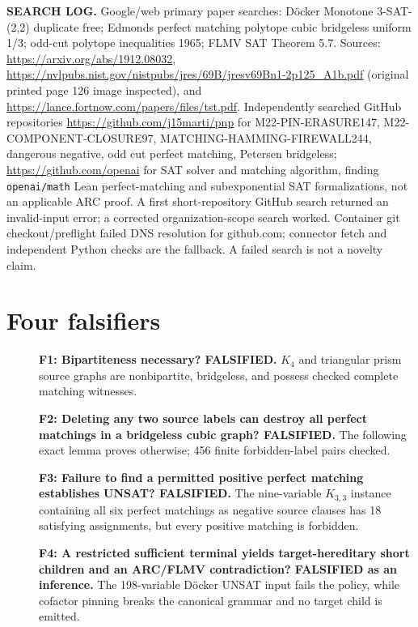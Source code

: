 \documentclass[11pt]{article}
\begin{document}
\noindent\textbf{SEARCH LOG.} Google/web primary paper searches: D\"ocker Monotone 3-SAT-(2,2) duplicate free; Edmonds perfect matching polytope cubic bridgeless uniform 1/3; odd-cut polytope inequalities 1965; FLMV SAT Theorem 5.7. Sources: \url{https://arxiv.org/abs/1912.08032}, \url{https://nvlpubs.nist.gov/nistpubs/jres/69B/jresv69Bn1-2p125_A1b.pdf} (original printed page 126 image inspected), and \url{https://lance.fortnow.com/papers/files/tst.pdf}. Independently searched GitHub repositories \url{https://github.com/j15marti/pnp} for M22-PIN-ERASURE147, M22-COMPONENT-CLOSURE97, MATCHING-HAMMING-FIREWALL244, dangerous negative, odd cut perfect matching, Petersen bridgeless; \url{https://github.com/openai} for SAT solver and matching algorithm, finding \texttt{openai/math} Lean perfect-matching and subexponential SAT formalizations, not an applicable ARC proof. A first short-repository GitHub search returned an invalid-input error; a corrected organization-scope search worked. Container git checkout/preflight failed DNS resolution for github.com; connector fetch and independent Python checks are the fallback. A failed search is not a novelty claim.

\section{Four falsifiers}
\begin{description}
\item[] \textbf{F1: Bipartiteness necessary? FALSIFIED.} $K_4$ and triangular prism source graphs are nonbipartite, bridgeless, and possess checked complete matching witnesses.
\item[] \textbf{F2: Deleting any two source labels can destroy all perfect matchings in a bridgeless cubic graph? FALSIFIED.} The following exact lemma proves otherwise; 456 finite forbidden-label pairs checked.
\item[] \textbf{F3: Failure to find a permitted positive perfect matching establishes UNSAT? FALSIFIED.} The nine-variable $K_{3,3}$ instance containing all six perfect matchings as negative source clauses has 18 satisfying assignments, but every positive matching is forbidden.
\item[] \textbf{F4: A restricted sufficient terminal yields target-hereditary short children and an ARC/FLMV contradiction? FALSIFIED as an inference.} The 198-variable Döcker UNSAT input fails the policy, while cofactor pinning breaks the canonical grammar and no target child is emitted.
\end{description}
\end{document}
